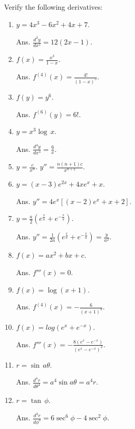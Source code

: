 Verify the following derivatives:

\begin{enumerate}
\item
$y = 4x^3 - 6x^2 + 4x + 7$.  	

Ans.	
$\frac{d^2 y}{dx^2} = 12(2x - 1)$.

\item
$f(x) = \frac{x^3}{1 - x}$.  	

Ans.	
$f^{(4)}(x) = \frac{4!}{(1 - x)^5}$.

\item
$f(y) = y^6$.  	

Ans.	$f^{(6)}(y) = 6!$.

\item
$y = x^3\log\, x$.  	

Ans.	
$\frac{d^4 y}{dx^4} = \frac{6}{x}$.

\item
$y = \frac{c}{x^n}$. 	
$y'' = \frac{n(n + 1)c}{x^{n + 2}}$.

\item
$y = (x - 3)e^{2x} + 4xe^x + x$.  	

Ans.	
$y'' = 4e^x[(x - 2)e^x + x + 2]$.

\item
$y = \frac{a}{2} (e^{\frac{x}{a}} + e^{-\frac{x}{a}})$.  	

Ans.	
$y'' = \frac{1}{2a} (e^{\frac{x}{a}} + e^{-\frac{x}{a}}) = \frac{y}{a^2}$.

\item
$f(x) = ax^2 + bx + c$.  	

Ans.	
$f'''(x) = 0$.

\item
$f(x) = \log(x + 1)$. 	 	

Ans.
$f^{(4)} (x) = -\frac{6}{(x + 1)^4}$.

\item
$f(x) = log(e^x + e^{-x})$.  	

Ans.
$f'''(x) = -\frac{8(e^x - e^{-x})}{(e^x - e^{-x})^3}$.

\item
$r = \sin\, a\theta$. 	 	

Ans.
$\frac{d^4 r}{d\theta^4} = a^4 \sin a\theta = a^4 r$.

\item
$r = \tan\, \phi$.  	

Ans.	
$\frac{d^3 r}{d\phi^3} = 6 \sec^6 \phi - 4 \sec^2 \phi$.


\end{enumerate}
